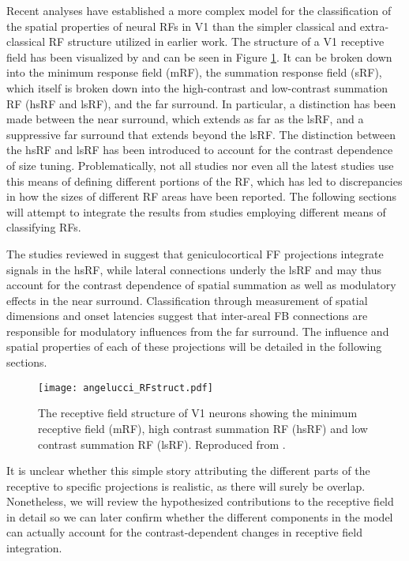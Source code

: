 Recent analyses have established a more complex model for the
classification of the spatial properties of neural RFs in V1 than the
simpler classical and extra-classical RF structure utilized in earlier
work. The structure of a V1 receptive field has been visualized by
\cite{Angelucci2006a} and can be seen in Figure \ref{RFstruct}. It can be
broken down into the minimum response field (mRF), the summation
response field (sRF), which itself is broken down into the
high-contrast and low-contrast summation RF (hsRF and lsRF), and the far 
surround. In particular, a distinction has been made between the near
surround, which extends as far as the lsRF, and a suppressive far
surround that extends beyond the lsRF. The distinction between the
hsRF and lsRF has been introduced to account for the contrast
dependence of size tuning. Problematically, not all studies nor even
all the latest studies use this means of defining different portions
of the RF, which has led to discrepancies in how the sizes of
different RF areas have been reported. The following sections will attempt
to integrate the results from studies employing different means of
classifying RFs.

The studies reviewed in \cite{Angelucci2006a} suggest that
geniculocortical FF projections integrate signals in the hsRF, while
lateral connections underly the lsRF and may thus account for the
contrast dependence of spatial summation as well as modulatory effects
in the near surround. Classification through measurement of spatial
dimensions and onset latencies suggest that inter-areal FB
connections are responsible for modulatory influences from the
far surround. The influence and spatial properties of each of these
projections will be detailed in the following sections.

\begin{figure}
	\centering
        \texttt{[image: angelucci\_RFstruct.pdf]}
	\caption[The structure of a receptive field in V1. Reproduced from
      \cite{Angelucci2006}.]{The receptive field structure of V1
      neurons showing the minimum receptive field (mRF), high contrast
      summation RF (hsRF) and low contrast summation RF
      (lsRF). Reproduced from \cite{Angelucci2006}.}
	\label{RFstruct}
\end{figure}

It is unclear whether this simple story attributing the different
parts of the receptive to specific projections is realistic, as there
will surely be overlap. Nonetheless, we will review the hypothesized contributions
to the receptive field in detail so we can later confirm whether the
different components in the model can actually account for the
contrast-dependent changes in receptive field integration.

